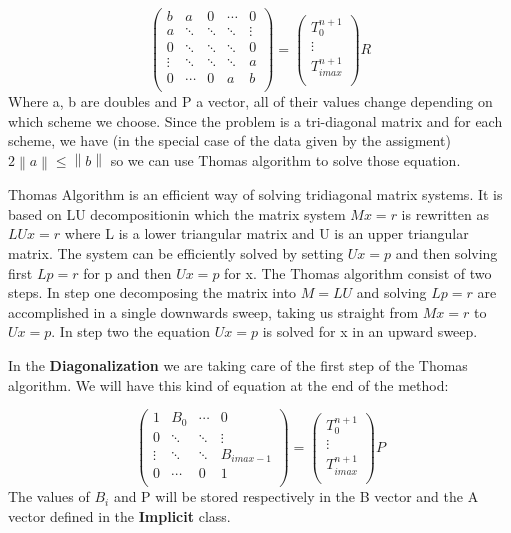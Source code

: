 \documentclass [10 pt, a4 paper]{article}
\begin{document}
\begin{equation}
\begin{pmatrix} b    &    a   &    0   & \cdots &   0    \\
a    & \ddots & \ddots & \ddots & \vdots \\
0    & \ddots & \ddots & \ddots &    0   \\
\vdots & \ddots & \ddots & \ddots &   a    \\ 
0    & \cdots &    0   &   a    &    b   \\
\end{pmatrix}
=
\begin{pmatrix} T_{0}^{n+1} \\ 
\vdots \\ 
T_{imax}^{n+1} \\
\end{pmatrix}
R
\end{equation}
Where a, b are doubles and P a vector, all of their values change depending on 
which scheme we choose. Since the problem is a tri-diagonal matrix and for each scheme,
we have (in the special case of the data given by the assigment) 
$ 2\left \| a \right \| \leq \left \| b \right \| $ so we can use Thomas algorithm to
solve those equation.

Thomas Algorithm is an efficient way of solving tridiagonal matrix systems. It is based
on LU decompositionin which the matrix system $Mx = r$ is rewritten as $LUx = r$ where L 
is a lower triangular matrix and U is an upper triangular matrix. The system can be 
efficiently solved by setting $Ux = p$ and then solving first $Lp = r$ for p and then 
$Ux=p$ for x. The Thomas algorithm consist of two steps. In step one decomposing the matrix
into $M=LU$ and solving $Lp=r$ are accomplished in a single downwards sweep, taking us
straight from $Mx=r$ to $Ux=p$. In step two the equation $Ux=p$ is solved for x in  an
upward sweep.

In the \textbf{Diagonalization} we are taking care of the first step of the Thomas algorithm.
We will have this kind of equation at the end of the method:

\begin{equation}
\begin{pmatrix} 1    &    B_{0}    & \cdots &   0    \\
                0    & \ddots     & \ddots  & \vdots \\
                \vdots & \ddots & \ddots & B_{imax - 1}  \\ 
                0    & \cdots   &   0    &    1   \\
\end{pmatrix}
=
\begin{pmatrix} T_{0}^{n+1} \\ 
\vdots \\ 
T_{imax}^{n+1} \\
\end{pmatrix}
P
\end{equation}
The values of $B_{i}$ and P will be stored respectively in the B vector and the A
vector defined in the \textbf{Implicit} class.
\end{document}
